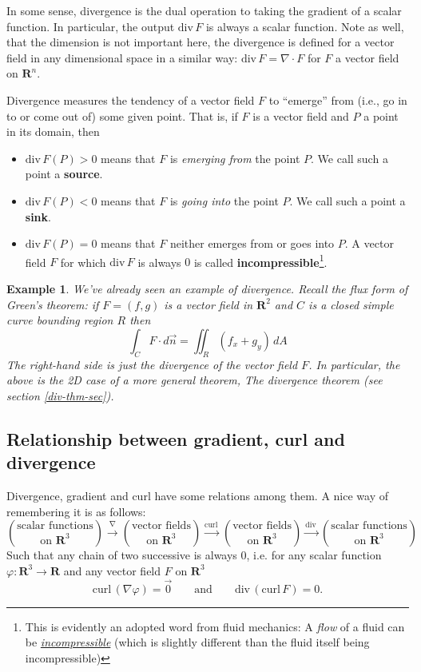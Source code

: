 \documentclass[12pt]{article}
\numberwithin{equation}{subsection}
\numberwithin{figure}{subsection}
\theoremstyle{note}
\newtheorem{example}[subsection]{Example}
\newcommand{\curl}{\mathrm{curl\,}}
\newcommand{\dv}{\mathrm{div\,}}
\begin{document}
{In some sense, divergence is the dual operation to taking the gradient of a scalar function. In particular, the output $\dv F$ is always a scalar function. Note as well, that the dimension is not important here, the  divergence is defined for a vector field in any dimensional space in a similar way: $\dv F=\nabla \cdot F$ for $F$ a vector field on $\mathbf{R}^n$. 


Divergence measures the tendency of a vector field $F$ to ``emerge'' from (i.e., go in to or come out of) some given point. That is, if $F$ is a vector field and $P$ a point in its domain, then\begin{itemize}
	\item $\dv F(P)>0$ means that $F$ is \textit{emerging from} the point $P$. We  call such a  point a \textbf{source}.
	\item $\dv F(P)<0$ means that $F$ is \textit{going into} the point $P$. We  call such a point a  \textbf{sink}.
	\item $\dv F(P)=0$ means that $F$ neither emerges from or goes into $P$. A vector field $F$ for which $\dv F$ is always $0$  is called \textbf{incompressible}\footnote{This is evidently an adopted word from fluid mechanics: A \textit{flow} of a fluid can be  \href{https://en.wikipedia.org/wiki/Incompressible_flow}{\textit{incompressible}} (which is slightly different than the fluid itself being incompressible)}. 
\end{itemize}

\begin{example}
	We've already seen an example of divergence. Recall the flux form of Green's theorem: if $F=(f,g)$ is a vector field in $\mathbf{R}^2$ and $C$ is a closed simple curve bounding region $R$ then \begin{equation} \int_C F\cdot d\vec{n}=\iint_R (f_x+g_y)\,dA\end{equation}
The right-hand side is just the divergence of the vector field $F$. In particular, the above is the 2D case of a more general theorem, \textit{The divergence theorem} (see section \ref{div-thm-sec}).
\end{example}

\subsection{Relationship between gradient, curl and divergence} 

Divergence, gradient and curl have some relations among them. A nice way of remembering it is as follows:
\[ \binom{\text{scalar functions}}{\text{on $\mathbf{R}^3$}} \xrightarrow{\nabla} 
\binom{\text{vector fields}}{\text{on $\mathbf{R}^3$}} \xrightarrow{ \curl} 
\binom{\text{vector fields}}{\text{on $\mathbf{R}^3$}} \xrightarrow{\dv} 
\binom{\text{scalar functions}}{\text{on $\mathbf{R}^3$}}  \]
Such that any chain of two successive is always $0$, i.e. for any scalar function $\varphi\colon\mathbf{R}^3\to \mathbf{R}$ and any vector field $F$ on $\mathbf{R}^3$  \[\curl (\nabla\varphi )=\vec{0} \qquad  \text{and} \qquad \dv (\curl  F)=0.\]



}
\end{document}
